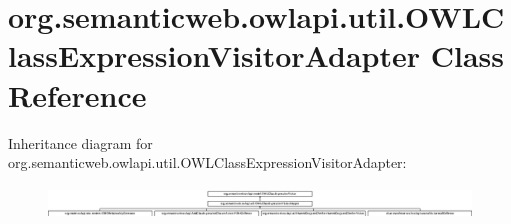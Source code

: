 \hypertarget{classorg_1_1semanticweb_1_1owlapi_1_1util_1_1_o_w_l_class_expression_visitor_adapter}{\section{org.\-semanticweb.\-owlapi.\-util.\-O\-W\-L\-Class\-Expression\-Visitor\-Adapter Class Reference}
\label{classorg_1_1semanticweb_1_1owlapi_1_1util_1_1_o_w_l_class_expression_visitor_adapter}
}
Inheritance diagram for org.\-semanticweb.\-owlapi.\-util.\-O\-W\-L\-Class\-Expression\-Visitor\-Adapter\-:\begin{figure}[H]
\begin{center}
\leavevmode
\includegraphics[height=0.851927cm]{classorg_1_1semanticweb_1_1owlapi_1_1util_1_1_o_w_l_class_expression_visitor_adapter}
\end{center}
\end{figure}

